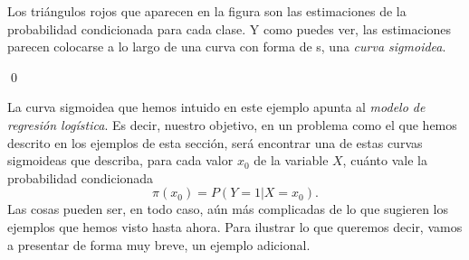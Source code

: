 \begin{ejemplo}
\begin{enumerate}
    Los triángulos rojos que aparecen en la figura son las estimaciones de la probabilidad
    condicionada para cada clase. Y como puedes ver, las estimaciones parecen colocarse a lo
    largo de una curva con forma de s, una {\em curva sigmoidea}.
\end{enumerate}
\qed
\end{ejemplo}
\noindent La curva sigmoidea que hemos intuido en este ejemplo apunta al {\em modelo de regresión
logística}. Es decir, nuestro objetivo, en un problema como el que hemos descrito en los ejemplos
de esta sección, será encontrar una de estas curvas sigmoideas que describa, para cada valor $x_0$
de la variable $X$, cuánto vale la probabilidad condicionada
\begin{equation}
\label{cap13:ecu:NotacionPiProbabilidadCondicionada}
\pi(x_0)=P(Y=1|X=x_0).
\end{equation}
Las cosas pueden ser, en todo caso, aún más complicadas de lo que sugieren los ejemplos que hemos visto hasta ahora. Para ilustrar lo que queremos decir, vamos a presentar de forma muy breve, un ejemplo adicional.
